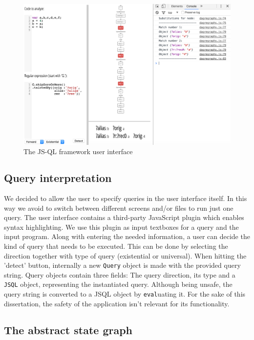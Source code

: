 \begin{figure}[h]
    \centering
      \includegraphics[width=1\textwidth]{images/UI} 
      \caption{The JS-QL framework user interface}
    \label{fig:UI}
\end{figure}

\subsection*{Query interpretation}

We decided to allow the user to specify queries in the user interface itself. In this way we avoid to switch between different screens and/or files to run just one query. The user interface contains a third-party JavaScript plugin which enables syntax highlighting. We use this plugin as input textboxes for a query and the input program. Along with entering the needed information, a user can decide the kind of query that needs to be executed. This can be done by selecting the direction together with type of query (existential or universal). When hitting the 'detect' button, internally a new \texttt{Query} object is made with the provided query string. Query objects contain three fields: The query direction, its type and a \texttt{JSQL} object, representing the instantiated query. Although being unsafe, the query string is converted to a JSQL object by \texttt{eval}uating it. For the sake of this dissertation, the safety of the application isn't relevant for its functionality.

\subsection*{The abstract state graph}

